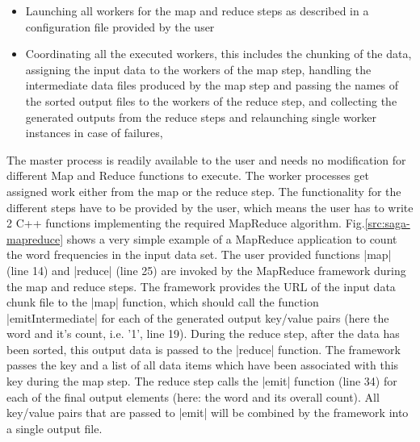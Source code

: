 \documentclass[conference,final]{IEEEtran}
\begin{document}
\begin{itemize}
\item Launching all workers for the map and reduce steps as described
  in a configuration file provided by the user 
\item Coordinating all the executed workers, this includes the
  chunking of the data, assigning the input data to the workers of the
  map step, handling the intermediate data files produced by the map
  step and passing the names of the sorted output files to the workers
  of the reduce step, and collecting the generated outputs from the
  reduce steps and relaunching single worker instances in case of
  failures,
\end{itemize}

The master process is readily available to the user and needs no
modification for different Map and Reduce functions to execute.  The
worker processes get assigned work either from the map or the reduce
step. The functionality for the different steps have to be provided by
the user, which means the user has to write 2 C++ functions
implementing the required MapReduce algorithm.
Fig.\ref{src:saga-mapreduce} shows a very simple example of a
MapReduce application to count the word frequencies in the
input data set. The user provided functions |map| (line 14) and
|reduce| (line 25) are invoked by the MapReduce framework during the
map and reduce steps. The framework provides the URL of the input data
chunk file to the |map| function, which should call the function
|emitIntermediate| for each of the generated output key/value pairs
(here the word and it's count, i.e. '1', line 19). During the
reduce step, after the data has been sorted, this output data is
passed to the |reduce| function. The framework passes the key and a
list of all data items which have been associated with this key during
the map step. The reduce step calls the |emit| function
(line 34) for each of the final output elements (here: the word
and its overall count). All key/value pairs that are passed to |emit|
will be combined by the framework into a single output file.
\end{document}
